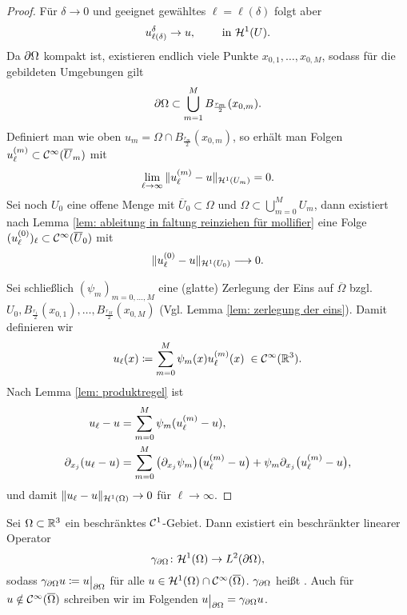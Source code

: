 \begin{proof}
	Für \(\delta\to0\) und geeignet gewähltes \(\ell=\ell(\delta)\) folgt aber
	\begin{equation*}
		u_{\ell(\delta)}^\delta\to u,\qquad\text{ in }\mathcal{H}^1(U).
	\end{equation*}
	Da \(\partial\Omega\) kompakt ist, existieren endlich viele Punkte \(x_{0,1},\ldots,x_{0,M}\), sodass für die gebildeten Umgebungen gilt
	\begin{equation*}
		\partial\Omega\subset\bigcup_{m=1}^MB_\frac{r_m}{2}(x_{0,m}).
	\end{equation*}
	Definiert man wie oben \(u_m=\Omega\cap B_\frac{r_m}{2}(x_{0,m})\), so erhält man Folgen \(u_\ell^{(m)}\subset\mathcal{C}^\infty(\overline{U}_m)\) mit 
	\begin{equation*}
		\lim_{\ell\to\infty}\|u_\ell^{(m)}-u\|_{\mathcal{H}^1(U_m)}=0.
	\end{equation*}
	Sei noch \(U_0\) eine offene Menge mit \(\overline{U}_0\subset\Omega\) und \(\Omega\subset\bigcup_{m=0}^MU_m\), dann existiert nach Lemma \ref{lem: ableitung in faltung reinziehen für mollifier} eine Folge \((u_\ell^{(0)})_\ell\subset\mathcal{C}^\infty(\overline{U}_0)\) mit
	\begin{equation*}
		\|u_\ell^{(0)}-u\|_{\mathcal{H}^1(U_0)}\longrightarrow0.
	\end{equation*}\vspace{1mm}

	Sei schließlich \((\psi_m)_{m=0,\ldots,M}\) eine (glatte) Zerlegung der Eins auf \(\overline{\Omega}\) bzgl. \(U_0, B_{\frac{r_1}{2}}(x_{0,1}),\ldots,B_{\frac{r_M}{2}}(x_{0,M})\) (Vgl. Lemma \ref{lem: zerlegung der eins}). Damit definieren wir
	\begin{equation*}
		u_\ell(x)\coloneqq\sum_{m=0}^M\psi_m(x)u_\ell^{(m)}(x)\;\in\mathcal{C}^\infty(\mathbb{R}^3).
	\end{equation*}
	Nach Lemma \ref{lem: produktregel} ist
	\begin{align*}
		u_\ell - u&=\sum_{m=0}^M\psi_m(u_\ell^{(m)}-u),\\
		\partial_{x_j}(u_\ell-u)&=\sum_{m=0}^M \big(\partial_{x_j}\psi_m\big)\big(u_\ell^{(m)}-u\big) + \psi_m\partial_{x_j}\big(u_\ell^{(m)}-u\big),
	\end{align*}
	und damit \(\|u_\ell-u\|_{\mathcal{H}^1(\Omega)}\to0\) für \(\ell\to\infty\).
\end{proof}
\begin{de+sa}[Spursatz]\label{def+satz: spursatz}
	Sei \(\Omega\subset\mathbb{R}^3\) ein beschränktes \(\mathcal{C}^1\)-Gebiet. Dann existiert ein beschränkter linearer Operator
	\begin{equation*}
		\gamma_{\partial\Omega}\colon\mathcal{H}^1(\Omega) \to L^2(\partial\Omega),
	\end{equation*}
	sodass \(\gamma_{\p\Omega}u\coloneqq u\restrict{\p\Omega}\) für alle \(u\in\mathcal{H}^1(\Omega)\cap\mathcal{C}^\infty(\overline{\Omega})\). \(\gamma_{\partial\Omega}\) heißt . Auch für \(u\notin\mathcal{C}^\infty(\overline{\Omega})\) schreiben wir im Folgenden \(u\restrict{\p\Omega}=\gamma_{\p\Omega}u\).
\end{de+sa}
